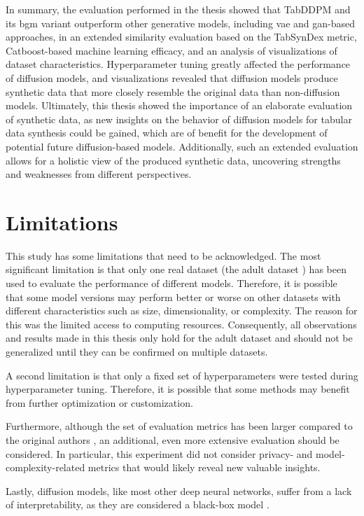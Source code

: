 In summary, the evaluation performed in the thesis showed that TabDDPM and its \gls{bgm} variant outperform other generative models,
including \gls{vae} and \gls{gan}-based approaches, in an extended similarity evaluation based on the TabSynDex metric,
Catboost-based machine learning efficacy, and an analysis of visualizations of dataset characteristics.
Hyperparameter tuning greatly affected the performance of diffusion models, and visualizations revealed that diffusion models produce synthetic data that more closely resemble the original data than non-diffusion models.
Ultimately, this thesis showed the importance of an elaborate evaluation of synthetic data, as new insights on the behavior of diffusion models for tabular data synthesis could be gained,
which are of benefit for the development of potential future diffusion-based models.
Additionally, such an extended evaluation allows for a holistic view of the produced synthetic data, uncovering strengths and weaknesses from different perspectives.
\newpage
\section{Limitations}
\label{ch:results-limitations}

This study has some limitations that need to be acknowledged.
The most significant limitation is that only one real dataset (the adult dataset \cite{Dua:2019}) has been used to evaluate the performance of different models.
Therefore, it is possible that some \gls{model} versions may perform better or worse on other datasets with different characteristics such as size, dimensionality, or complexity.
The reason for this was the limited access to computing resources.
Consequently, all observations and results made in this thesis only hold for the adult dataset and should not be generalized until they can be confirmed on multiple datasets.

A second limitation is that only a fixed set of hyperparameters were tested during hyperparameter tuning.
Therefore, it is possible that some methods may benefit from further optimization or customization.

Furthermore, although the set of evaluation metrics has been larger compared to the original authors \cite{kotelnikov2022TabDDPMModellingTabular},
an additional, even more extensive evaluation should be considered.
In particular, this experiment did not consider privacy- and model-complexity-related metrics that would likely reveal new valuable insights.

Lastly, diffusion models, like most other deep neural networks, suffer from a lack of interpretability, as they are considered a black-box \gls{model} \cite{benitez1997AreArtificialNeural}.